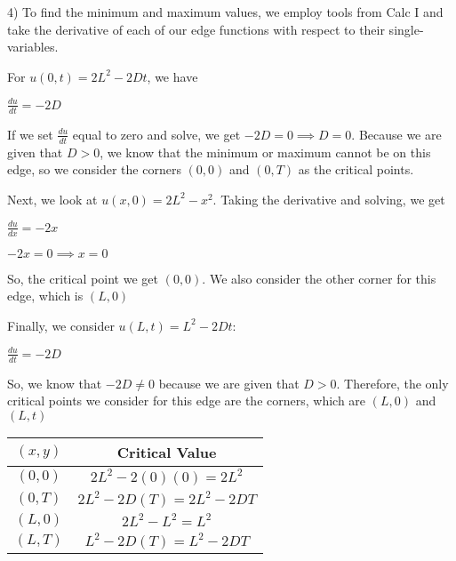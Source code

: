 \documentclass[executivepaper]{article}
\begin{document}
\begin{flushleft}

4) To find the minimum and maximum values, we employ tools from Calc I and take the derivative of each of our edge functions with respect to their single-variables. 

\begin{center}

For $u(0,t)=2L^2-2Dt$, we have

\vspace{3mm}

$\frac{du}{dt}=-2D$

\pagebreak

\vspace*{-40mm}

If we set $\frac{du}{dt}$ equal to zero and solve, we get $-2D=0 \implies D=0$. Because we are given that $D > 0$, we know that the minimum or maximum cannot be on this edge, so we consider the corners $(0,0)$ and $(0,T)$ as the critical points.

\vspace{3mm}

Next, we look at $u(x,0)=2L^2-x^2$. Taking the derivative and solving, we get

\vspace{3mm}

$\frac{du}{dx}=-2x$

\vspace{3mm}

$-2x=0 \implies x=0$

\vspace{3mm}

So, the critical point we get $(0,0)$. We also consider the other corner for this edge, which is $(L,0)$

\vspace{3mm}

Finally, we consider $u(L,t)=L^2-2Dt$:

\vspace{3mm}

$\frac{du}{dt}=-2D$

\vspace{3mm}

So, we know that $-2D \neq 0$ because we are given that $D > 0$. Therefore, the only critical points we consider for this edge are the corners, which are $(L,0)$ and $(L,t)$

\vspace{5mm}

\begin{tabular}{||c c||} 
 \hline
 $(x,y)$ & Critical Value  \\ [0.5ex] 
 \hline\hline
 $(0,0)$ & $2L^2-2(0)(0)=2L^2$ \\ 
 \hline
 $(0,T)$ & $2L^2-2D(T)=2L^2-2DT$ \\
 \hline
 $(L,0)$ & $2L^2-L^2=L^2$ \\
 \hline
 $(L,T)$ & $L^2-2D(T)=L^2-2DT$ \\[1ex]
 \hline
\end{tabular}


\end{center}
\end{flushleft}
\end{document}
